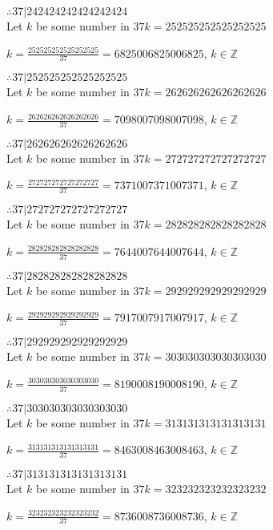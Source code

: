\documentclass{article}
\begin{document}
$ \therefore  37|242424242424242424 $ \\

Let $k$ be some number in $37k = 252525252525252525$

$k = \frac{252525252525252525}{37} = 6825006825006825$, $k \in \mathbb{Z}$

$ \therefore  37|252525252525252525 $ \\

Let $k$ be some number in $37k = 262626262626262626$

$k = \frac{262626262626262626}{37} = 7098007098007098$, $k \in \mathbb{Z}$

$ \therefore  37|262626262626262626 $ \\

Let $k$ be some number in $37k = 272727272727272727$

$k = \frac{272727272727272727}{37} = 7371007371007371$, $k \in \mathbb{Z}$

$ \therefore  37|272727272727272727 $ \\

Let $k$ be some number in $37k = 282828282828282828$

$k = \frac{282828282828282828}{37} = 7644007644007644$, $k \in \mathbb{Z}$

$ \therefore  37|282828282828282828 $ \\

Let $k$ be some number in $37k = 292929292929292929$

$k = \frac{292929292929292929}{37} = 7917007917007917$, $k \in \mathbb{Z}$

$ \therefore  37|292929292929292929 $ \\

Let $k$ be some number in $37k = 303030303030303030$

$k = \frac{303030303030303030}{37} = 8190008190008190$, $k \in \mathbb{Z}$

$ \therefore  37|303030303030303030 $ \\

Let $k$ be some number in $37k = 313131313131313131$

$k = \frac{313131313131313131}{37} = 8463008463008463$, $k \in \mathbb{Z}$

$ \therefore  37|313131313131313131 $ \\

Let $k$ be some number in $37k = 323232323232323232$

$k = \frac{323232323232323232}{37} = 8736008736008736$, $k \in \mathbb{Z}$
\end{document}
